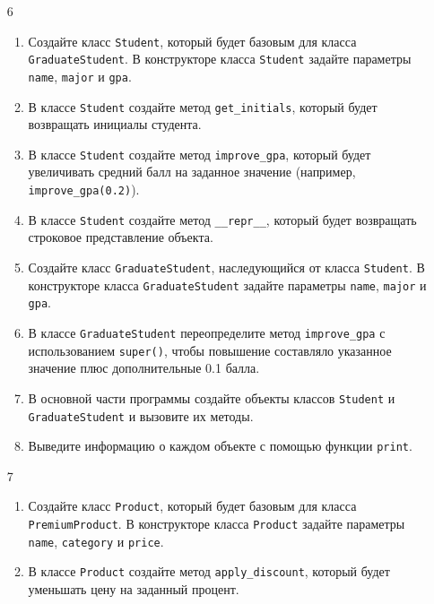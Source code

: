 \begin{enumerate}
\item[6] 
\begin{enumerate}
    \item Создайте класс \texttt{Student}, который будет базовым для класса \texttt{GraduateStudent}. В конструкторе класса \texttt{Student} задайте параметры \texttt{name}, \texttt{major} и \texttt{gpa}.
    
    \item В классе \texttt{Student} создайте метод \texttt{get\_initials}, который будет возвращать инициалы студента.
    
    \item В классе \texttt{Student} создайте метод \texttt{improve\_gpa}, который будет увеличивать средний балл на заданное значение (например, \texttt{improve\_gpa(0.2)}).
    
    \item В классе \texttt{Student} создайте метод \texttt{\_\_repr\_\_}, который будет возвращать строковое представление объекта.
    
    \item Создайте класс \texttt{GraduateStudent}, наследующийся от класса \texttt{Student}. В конструкторе класса \texttt{GraduateStudent} задайте параметры \texttt{name}, \texttt{major} и \texttt{gpa}.
    
    \item В классе \texttt{GraduateStudent} переопределите метод \texttt{improve\_gpa} с использованием \texttt{super()}, чтобы повышение составляло указанное значение плюс дополнительные 0.1 балла.
    
    \item В основной части программы создайте объекты классов \texttt{Student} и \texttt{GraduateStudent} и вызовите их методы.
    
    \item Выведите информацию о каждом объекте с помощью функции \texttt{print}.
\end{enumerate}

\item[7] 
\begin{enumerate}
    \item Создайте класс \texttt{Product}, который будет базовым для класса \texttt{PremiumProduct}. В конструкторе класса \texttt{Product} задайте параметры \texttt{name}, \texttt{category} и \texttt{price}.
    
    \item В классе \texttt{Product} создайте метод \texttt{apply\_discount}, который будет уменьшать цену на заданный процент.
    

\end{enumerate}
\end{enumerate}
